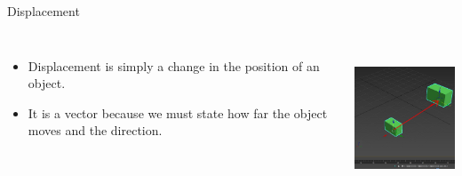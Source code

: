 \documentclass[]{beamer}
\begin{document}
      \begin{frame}
        Displacement 
        \vspace{3 mm}
        
        
        
           \begin{columns}[c]
           \column{2in}  %
          
        
        
        \begin{itemize}
        \item Displacement is simply a change in the position of an object. 
        
        \item It  is a vector because we must state how far the object moves and the direction.
        
        
        
        \end{itemize}
        
        
           \column{2in}
        
        
        
        
          \begin{center}
          \includegraphics[height=1.7in]{images/dis3d3.jpg}
        \end{center}
        
        
           \end{columns}
        
         \end{frame}
        
\end{document}

